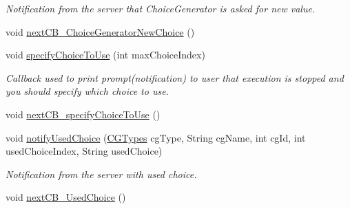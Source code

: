 \begin{DoxyCompactItemize}
\begin{DoxyCompactList}\small\item\em Notification from the server that Choice\+Generator is asked for new value. \end{DoxyCompactList}\item 
void \hyperlink{classgov_1_1nasa_1_1jpf_1_1inspector_1_1client_1_1_callback_execution_decorator_a83e088e53fbe3169453074e2224792d1}{next\+C\+B\+\_\+\+Choice\+Generator\+New\+Choice} ()
\item 
void \hyperlink{classgov_1_1nasa_1_1jpf_1_1inspector_1_1client_1_1_callback_execution_decorator_a5e310e2a3329802f45aedf11b9e60ddd}{specify\+Choice\+To\+Use} (int max\+Choice\+Index)
\begin{DoxyCompactList}\small\item\em Callback used to print prompt(notification) to user that execution is stopped and you should specify which choice to use. \end{DoxyCompactList}\item 
void \hyperlink{classgov_1_1nasa_1_1jpf_1_1inspector_1_1client_1_1_callback_execution_decorator_abed7cefb0c283ee75838c702d0dee280}{next\+C\+B\+\_\+specify\+Choice\+To\+Use} ()
\item 
void \hyperlink{classgov_1_1nasa_1_1jpf_1_1inspector_1_1client_1_1_callback_execution_decorator_ad00cc4ffa19388cbd0881b5e98ae085f}{notify\+Used\+Choice} (\hyperlink{enumgov_1_1nasa_1_1jpf_1_1inspector_1_1interfaces_1_1_choice_generators_interface_1_1_c_g_types}{C\+G\+Types} cg\+Type, String cg\+Name, int cg\+Id, int used\+Choice\+Index, String used\+Choice)
\begin{DoxyCompactList}\small\item\em Notification from the server with used choice. \end{DoxyCompactList}\item 
void \hyperlink{classgov_1_1nasa_1_1jpf_1_1inspector_1_1client_1_1_callback_execution_decorator_a17ee5ecb5cfdaaa9e7feb3c662280a1c}{next\+C\+B\+\_\+\+Used\+Choice} ()
\end{DoxyCompactItemize}
